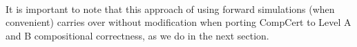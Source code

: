 


\paragraph*{}

  It is important to note that this approach of using forward simulations (when
convenient) carries over without modification when porting CompCert to Level A and B compositional
correctness, as we do in the next section.



